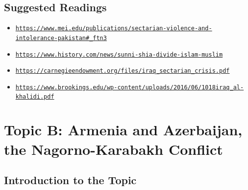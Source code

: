 \documentclass[10pt, letterpaper]{article}
\begin{document}
\subsection{Suggested Readings}

\begin{itemize}
\item
  
  \texttt{\href{https://www.mei.edu/publications/sectarian-violence-and-intolerance-pakistan\#_ftn3}{{https://www.mei.edu/publications/sectarian-violence-and-intolerance-pakistan\#\_ftn3}}}
  
\item
  
  \texttt{\href{https://www.history.com/news/sunni-shia-divide-islam-muslim}{{https://www.history.com/news/sunni-shia-divide-islam-muslim}}}
  
\item
  
  \texttt{\href{https://carnegieendowment.org/files/iraq_sectarian_crisis.pdf}{{https://carnegieendowment.org/files/iraq\_sectarian\_crisis.pdf}}}
  
\item
  
  \texttt{\href{https://www.brookings.edu/wp-content/uploads/2016/06/1018iraq_al-khalidi.pdf}{{https://www.brookings.edu/wp-content/uploads/2016/06/1018iraq\_al-khalidi.pdf}}}
  
\end{itemize}

\newpage
\section{Topic B: Armenia and Azerbaijan, the Nagorno-Karabakh Conflict}

\subsection{Introduction to the Topic}
\end{document}
